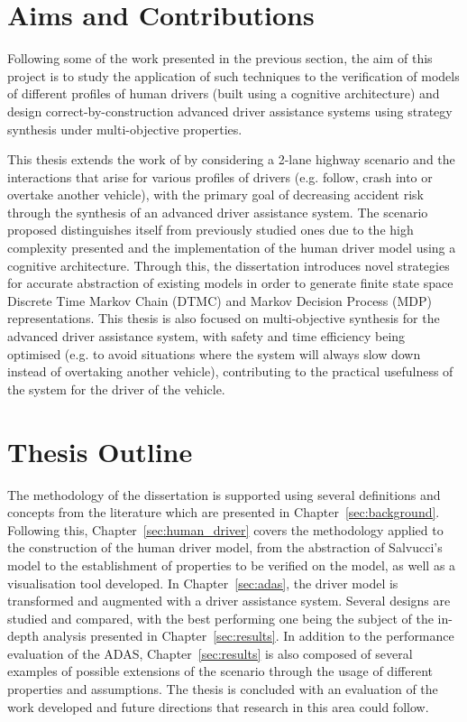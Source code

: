 \section{Aims and Contributions}

Following some of the work presented in the previous section, the aim of this project is to study the application of such techniques to the verification of models of different profiles of human drivers (built using a cognitive architecture) and design correct-by-construction advanced driver assistance systems using strategy synthesis under multi-objective properties. 

This thesis extends the work of \cite{games, lam, salvucci_1} by considering a 2-lane highway scenario and the interactions that arise for various profiles of drivers (e.g. follow, crash into or overtake another vehicle), with the primary goal of decreasing accident risk through the synthesis of an advanced driver assistance system. The scenario proposed distinguishes itself from previously studied ones due to the high complexity presented and the implementation of the human driver model using a cognitive architecture. Through this, the dissertation  introduces novel strategies for accurate abstraction of existing models in order to generate finite state space Discrete Time Markov Chain (DTMC) and Markov Decision Process (MDP) representations. This thesis is also focused on multi-objective synthesis for the advanced driver assistance system, with safety and time efficiency being optimised (e.g. to avoid situations where the system will always slow down instead of overtaking another vehicle), contributing to the practical usefulness of the system for the driver of the vehicle. 

\section{Thesis Outline}

The methodology of the dissertation is supported using several definitions and concepts from the literature which are presented in Chapter~\ref{sec:background}. Following this, Chapter~\ref{sec:human_driver} covers the methodology applied to the construction of the human driver model, from the abstraction of Salvucci's model to the establishment of properties to be verified on the model, as well as a visualisation tool developed. In Chapter~\ref{sec:adas}, the driver model is transformed and augmented with a driver assistance system. Several designs are studied and compared, with the best performing one being the subject of the in-depth analysis presented in Chapter~\ref{sec:results}. In addition to the performance evaluation of the ADAS, Chapter~\ref{sec:results} is also composed of several examples of possible extensions of the scenario through the usage of different properties and assumptions. The thesis is concluded with an evaluation of the work developed and future directions that research in this area could follow.












